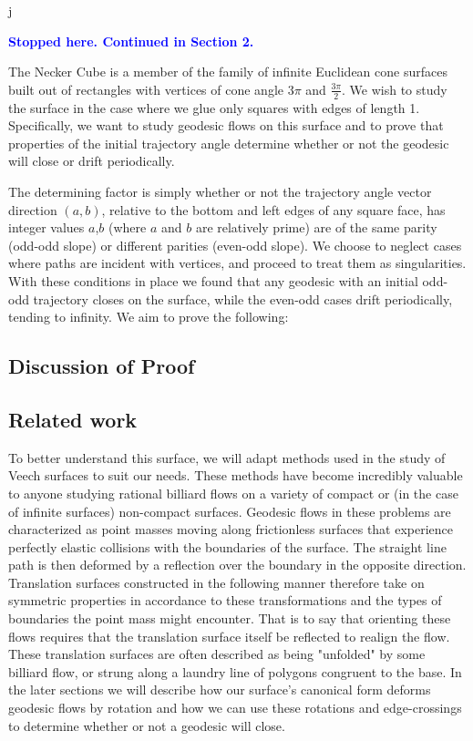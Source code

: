 j\documentclass[]{article}
\newcommand{\compav}[1]{\textbf{\textcolor{blue}{#1}}}
\begin{document}
\compav{Stopped here. Continued in Section 2.}

The Necker Cube is a member of the family of infinite Euclidean cone surfaces built out of rectangles with vertices of cone angle $3\pi$ and $\frac{3\pi}{2}$. We wish to study the surface in the case where we glue only squares with edges of length 1. Specifically, we want to study geodesic flows on this surface and to prove that properties of the initial trajectory angle determine whether or not the geodesic will close or drift periodically. 

The determining factor is simply whether or not the trajectory angle vector direction $(a,b)$, relative to the bottom and left edges of any square face, has integer values $a$,$b$ (where $a$ and $b$ are relatively prime) are of the same parity (odd-odd slope) or different parities (even-odd slope). We choose to neglect cases where paths are incident with vertices, and proceed to treat them as singularities. With these conditions in place we found that any geodesic with an initial odd-odd trajectory closes on the surface, while the even-odd cases drift periodically, tending to infinity. We aim to prove the following:



\subsection{Discussion of Proof}
\subsection{Related work}


To better understand this surface, we will adapt methods used in the study of Veech surfaces to suit our needs. These methods have become incredibly valuable to anyone studying rational billiard flows on a variety of compact or (in the case of infinite surfaces) non-compact surfaces. Geodesic flows in these problems are characterized as point masses moving along frictionless surfaces that experience perfectly elastic collisions with the boundaries of the surface. The straight line path is then deformed by a reflection over the boundary in the opposite direction. Translation surfaces constructed in the following manner therefore take on symmetric properties in accordance to these transformations and the types of boundaries the point mass might encounter. That is to say that orienting these flows requires that the translation surface itself be reflected to realign the flow. These translation surfaces are often described as being "unfolded" by some billiard flow, or strung along a laundry line of polygons congruent to the base. In the later sections we will describe how our surface's canonical form deforms geodesic flows by rotation and how we can use these rotations and edge-crossings to determine whether or not a geodesic will close.
\end{document}
